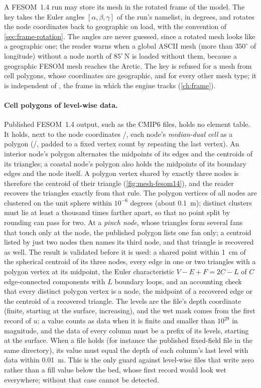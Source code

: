 A FESOM~1.4 run may store its mesh in the rotated frame of the model. The key 
takes the Euler angles $[\alpha,\beta,\gamma]$ of the run's namelist, in degrees, and rotates the node
coordinates back to geographic on load, with the convention of \cref{sec:frame-rotation}. The angles are
never guessed, since a rotated mesh looks like a geographic one; the reader warns when a global ASCII mesh
(more than $350^\circ$ of longitude) without a node north of $85^\circ$\,N is loaded without them, because a
geographic FESOM mesh reaches the Arctic. The key is refused for a mesh from cell polygons, whose
coordinates are geographic, and for every other mesh type; it is independent of , the
frame in which the engine tracks (\cref{ch:frame}).

\paragraph{Cell polygons of level-wise data.} Published FESOM~1.4 output, such as the CMIP6 files, holds
no element table. It holds, next to the node coordinates /, each node's
\emph{median-dual cell} as a polygon (/, padded to a fixed vertex count by
repeating the last vertex). An interior node's polygon alternates the midpoints of its edges and the
centroids of its triangles; a coastal node's polygon also holds the midpoints of its boundary edges and the
node itself. A polygon vertex shared by exactly three nodes is therefore the centroid of their triangle
(\cref{fig:mesh-fesom14}), and the reader recovers the triangles exactly from that rule. The polygon
vertices of all nodes are clustered on the unit sphere within $10^{-6}$ degrees (about \SI{0.1}{\metre});
distinct clusters must lie at least a thousand times farther apart, so that no point split by rounding can
pass for two. At a \emph{pinch node}, whose triangles form several fans that touch only at the node, the
published polygon lists one fan only; a centroid listed by just two nodes then names its third node, and
that triangle is recovered as well. The result is validated before it is used: a shared point within
\SI{1}{\centi\metre} of the spherical centroid of its three nodes, every edge in one or two triangles with a
polygon vertex at its midpoint, the Euler characteristic $V-E+F=2C-L$ of $C$ edge-connected components with
$L$ boundary loops, and an accounting check that every distinct polygon vertex is a node, the midpoint of a
recovered edge or the centroid of a recovered triangle. The levels are the file's depth coordinate (finite,
starting at the surface, increasing), and the wet mask comes from the first record of $u$: a value counts
as data when it is finite and smaller than $10^{29}$ in magnitude, and the data of every column must be a
prefix of its levels, starting at the surface. When a file holds  (for instance the published
fixed-field file in the same directory), its value must equal the depth of each column's last level with
data within \SI{0.01}{\metre}. This is the only guard against level-wise files that write zero rather than
a fill value below the bed, whose first record would look wet everywhere; without  that case
cannot be detected.

